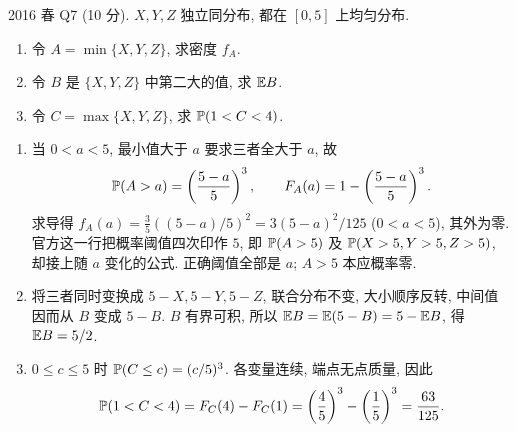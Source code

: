 \begin{exercise}\label{ex:fe2016q7}
2016 春 Q7 (10 分). $X,Y,Z$ 独立同分布, 都在 $[0,5]$ 上均匀分布.
\begin{enumerate}[label=(\alph*)]
\item\label{ex:fe2016q7-a} 令 $A=\min\{X,Y,Z\}$, 求密度 $f_A$.
\item\label{ex:fe2016q7-b} 令 $B$ 是 $\{X,Y,Z\}$ 中第二大的值, 求 $\mathbb E B$.
\item\label{ex:fe2016q7-c} 令 $C=\max\{X,Y,Z\}$, 求 $\mathbb P(1<C<4)$.
\end{enumerate}
\end{exercise}
\begin{solution}
\begin{enumerate}[label=(\alph*)]
\item\label{sol:fe2016q7-a} 当 $0<a<5$, 最小值大于 $a$ 要求三者全大于 $a$, 故
\[
 \mathbb P(A>a)=\left(\frac{5-a}{5}\right)^3,\qquad
 F_A(a)=1-\left(\frac{5-a}{5}\right)^3.
\]
求导得 $f_A(a)=\frac35((5-a)/5)^2=3(5-a)^2/125$ ($0<a<5$), 其外为零. 官方这一行把概率阈值四次印作 $5$, 即 $\mathbb P(A>5)$ 及 $\mathbb P(X>5,Y>5,Z>5)$, 却接上随 $a$ 变化的公式. 正确阈值全部是 $a$; $A>5$ 本应概率零.
\item\label{sol:fe2016q7-b} 将三者同时变换成 $5-X,5-Y,5-Z$, 联合分布不变, 大小顺序反转, 中间值因而从 $B$ 变成 $5-B$. $B$ 有界可积, 所以 $\mathbb E B=\mathbb E(5-B)=5-\mathbb E B$, 得 $\mathbb E B=5/2$.
\item\label{sol:fe2016q7-c} $0\le c\le5$ 时 $\mathbb P(C\le c)=(c/5)^3$. 各变量连续, 端点无点质量, 因此
\[
 \mathbb P(1<C<4)=F_C(4)-F_C(1)=\left(\frac45\right)^3-\left(\frac15\right)^3=\frac{63}{125}.
\]
\end{enumerate}
\end{solution}


